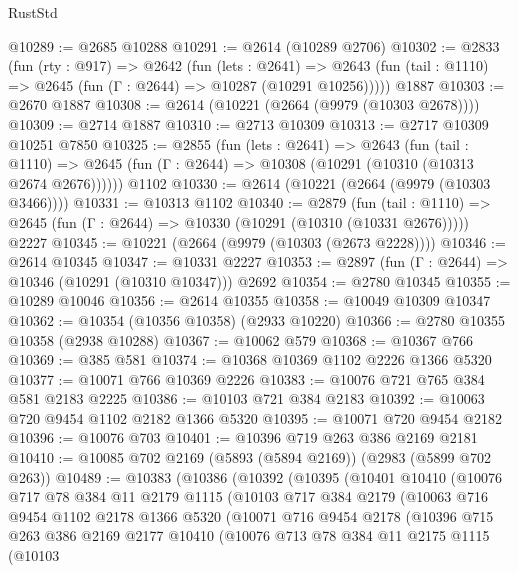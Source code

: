 \begin{lexlean}{RustStd}
\begin{coremodule}
@10289 := @2685 @10288
@10291 := @2614 (@10289 @2706)
@10302 := @2833
    (fun (rty : @917) =>
    @2642
      (fun (lets : @2641) =>
      @2643 (fun (tail : @1110) => @2645 (fun (Γ : @2644) => @10287 (@10291 @10256)))))
    @1887
@10303 := @2670 @1887
@10308 := @2614 (@10221 (@2664 (@9979 (@10303 @2678))))
@10309 := @2714 @1887
@10310 := @2713 @10309
@10313 := @2717 @10309 @10251 @7850
@10325 := @2855
    (fun (lets : @2641) =>
    @2643
      (fun (tail : @1110) =>
      @2645 (fun (Γ : @2644) => @10308 (@10291 (@10310 (@10313 @2674 @2676))))))
    @1102
@10330 := @2614 (@10221 (@2664 (@9979 (@10303 @3466))))
@10331 := @10313 @1102
@10340 := @2879
    (fun (tail : @1110) => @2645 (fun (Γ : @2644) => @10330 (@10291 (@10310 (@10331 @2676)))))
    @2227
@10345 := @10221 (@2664 (@9979 (@10303 (@2673 @2228))))
@10346 := @2614 @10345
@10347 := @10331 @2227
@10353 := @2897 (fun (Γ : @2644) => @10346 (@10291 (@10310 @10347))) @2692
@10354 := @2780 @10345
@10355 := @10289 @10046
@10356 := @2614 @10355
@10358 := @10049 @10309 @10347
@10362 := @10354 (@10356 @10358) (@2933 @10220)
@10366 := @2780 @10355 @10358 (@2938 @10288)
@10367 := @10062 @579
@10368 := @10367 @766
@10369 := @385 @581
@10374 := @10368 @10369 @1102 @2226 @1366 @5320
@10377 := @10071 @766 @10369 @2226
@10383 := @10076 @721 @765 @384 @581 @2183 @2225
@10386 := @10103 @721 @384 @2183
@10392 := @10063 @720 @9454 @1102 @2182 @1366 @5320
@10395 := @10071 @720 @9454 @2182
@10396 := @10076 @703
@10401 := @10396 @719 @263 @386 @2169 @2181
@10410 := @10085 @702 @2169 (@5893 (@5894 @2169)) (@2983 (@5899 @702 @263))
@10489 := @10383
    (@10386
      (@10392
        (@10395
          (@10401
            @10410
            (@10076
              @717
              @78
              @384
              @11
              @2179
              @1115
              (@10103
                @717
                @384
                @2179
                (@10063
                  @716
                  @9454
                  @1102
                  @2178
                  @1366
                  @5320
                  (@10071
                    @716
                    @9454
                    @2178
                    (@10396
                      @715
                      @263
                      @386
                      @2169
                      @2177
                      @10410
                      (@10076
                        @713
                        @78
                        @384
                        @11
                        @2175
                        @1115
                        (@10103

\end{coremodule}
\end{lexlean}
